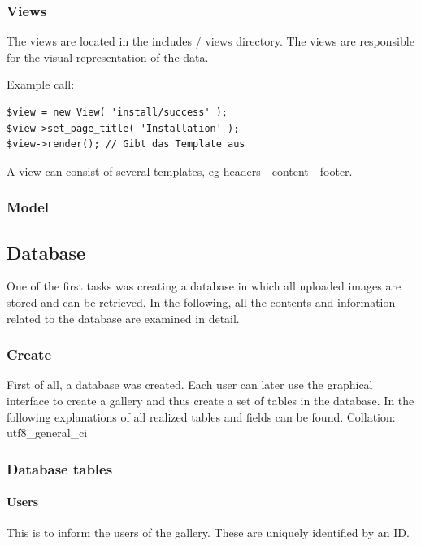 \documentclass[a4paper,12pt,oneside]{article} %
\begin{document}
\subsubsection*{Views}

The views are located in the
includes / views
directory. The views are responsible for the visual representation
of the data.

Example call:

\begin{lstlisting}
$view = new View( 'install/success' );
$view->set_page_title( 'Installation' );
$view->render(); // Gibt das Template aus
\end{lstlisting}

A view can consist of several templates, eg headers - content - footer.


\subsubsection*{Model}


\subsection{Database}

One of the first tasks was creating a database in which all uploaded
images are stored and can be retrieved. In the following, all the
contents and information related to the database are examined in detail.


\subsubsection{Create}

First of all, a database was created. Each user can later use the graphical
interface to create a gallery and thus create a set of tables in the
database. In the following explanations of all realized tables and fields
can be found. Collation: utf8\_general\_ci


\subsubsection{Database tables}


\paragraph*{Users}

This is to inform the users of the gallery. These are uniquely identified
by an ID.
\end{document}
